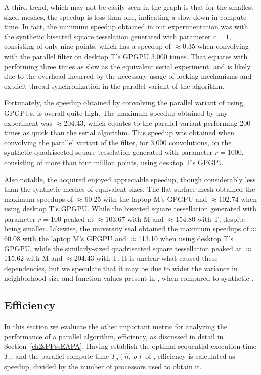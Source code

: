 A third trend, which may not be easily seen in the graph is that for the smallest-sized meshes, the speedup is less than one, indicating a slow down in compute time. In fact, the minimum speedup obtained in our experimentation was with the synthetic bisected square tesselation generated with parameter $r=1$, consisting of only nine points, which has a speedup of $\approx$0.35 when convolving with the parallel filter on desktop T's \gls{GPGPU} 3,000 times. That equates with performing three times as slow as the equivalent serial experiment, and is likely due to the overhead incurred by the necessary usage of locking mechanisms and explicit thread synchronization in the parallel variant of the algorithm.

Fortunately, the speedup obtained by convolving the parallel variant of  using GPGPUs, is overall quite high. The maximum speedup obtained by any experiment was $\approx$204.43, which equates to the parallel variant performing 200 times as quick than the serial algorithm. This speedup was obtained when convolving the parallel variant of the filter, for 3,000 convolutions, on the synthetic quadrisected square tesselation generated with parameter $r=1000$, consisting of more than four million points, using desktop T's \gls{GPGPU}. 

Also notable, the acquired \tdd{} enjoyed appreciable speedup, though considerably less than the synthetic meshes of equivalent sizes. The flat surface mesh obtained the maximum speedups of $\approx$60.25 with the laptop M's \gls{GPGPU} and $\approx$102.74 when using desktop T's \gls{GPGPU}. While the bisected square tessellation generated with parameter $r=100$ peaked at $\approx$103.67 with M and $\approx$154.80 with T, despite being smaller. Likewise, the university seal obtained the maximum speedups of$\approx$60.08 with the laptop M's \gls{GPGPU} and $\approx$113.10 when using desktop T's \gls{GPGPU}, while the similarly-sized quadrisected square tessellation peaked at $\approx$115.62 with M and $\approx$204.43 with T. It is unclear what caused these dependencies, but we speculate that it may be due to wider the variance in neighborhood size and function values present in \tdd{}, when compared to synthetic \tdd{}.

%
%
%
%
\subsection{Efficiency}
\label{ch6sCWGssE}
In this section we evaluate the other important metric for analyzing the performance of a parallel algorithm, \gls{efficiency}, as discussed in detail in Section~\ref{ch2sPPssEAPA}. Having establish the optimal sequential execution time $\mathit{T_s}$, and the parallel compute time $\mathit{T_{\rho}}(\hat{n},\,\rho)$ of , \gls{efficiency} is calculated as \gls{speedup}, divided by the number of processors used to obtain it.

